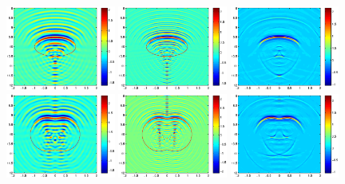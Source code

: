 \documentclass[11pt]{iopart}
\begin{document}
\begin{figure}
	\centering
	\includegraphics[width=0.32\textwidth]{./graphic/circle_3pi.eps}
	\includegraphics[width=0.32\textwidth]{./graphic/circle_5pi.eps}
	\includegraphics[width=0.32\textwidth]{./graphic/circle.eps}
	\includegraphics[width=0.32\textwidth]{./graphic/peanut_3pi.eps}
	\includegraphics[width=0.32\textwidth]{./graphic/peanut_5pi.eps}
	\includegraphics[width=0.32\textwidth]{./graphic/peanut.eps}

\end{figure}
\end{document}
